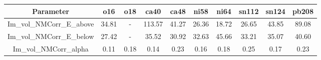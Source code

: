 \begin{tabular}{|c||c||c||c||c||c||c||c||c||c|} 
 \hline 
\bf{Parameter}& \bf{o16}& \bf{o18}& \bf{ca40}& \bf{ca48}& \bf{ni58}& \bf{ni64}& \bf{sn112}& \bf{sn124}& \bf{pb208}\\
 \hline
 \hline 
Im\_vol\_NMCorr\_E\_above & 34.81 & - & 113.57 & 41.27 & 26.36 & 18.72 & 26.65 & 43.85 & 89.08\\
Im\_vol\_NMCorr\_E\_below & 27.42 & - & 35.52 & 30.92 & 32.63 & 45.66 & 33.21 & 35.07 & 40.60\\
Im\_vol\_NMCorr\_alpha & 0.11 & 0.18 & 0.14 & 0.23 & 0.16 & 0.18 & 0.25 & 0.17 & 0.23\\

 \hline 
\end{tabular}